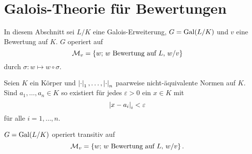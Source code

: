 

\section{Galois-Theorie für Bewertungen}


\begin{setting}
	In diesem Abschnitt sei $L/K$ eine Galois-Erweiterung, $G= \operatorname{Gal}(L/K)$ und $v$ eine Bewertung auf $K$. $G$ operiert auf
	\[ \mathcal{M}_v = \left\{
	w; \, \text{$w$ Bewertung auf $L$, $w/v$}
	\right\}
	\]
	durch $\sigma \colon w \mapsto w \circ \sigma$.
\end{setting}

\begin{Prop}[Approximationssatz]
	Seien $K$ ein Körper und $\left|{\cdot}\right|_1, \dots, \left|{\cdot}\right|_n$ paarweise nicht-äquivalente Normen auf $K$.
	Sind $a_1,\dots, a_n \in K$ so existiert für jedes $\varepsilon>0$ ein $x \in K$ mit
	\[ \left|{x-a_i}\right|_i < \varepsilon
	\]
	für alle $i=1,\dots,n$.
\end{Prop}

\begin{Prop}
	$G=\operatorname{Gal}(L/K)$ operiert transitiv auf 
	\[ \mathcal{M}_v = \left\{
	w; \, \text{$w$ Bewertung auf $L$, $w/v$}
	\right\}.
	\]
\end{Prop}


